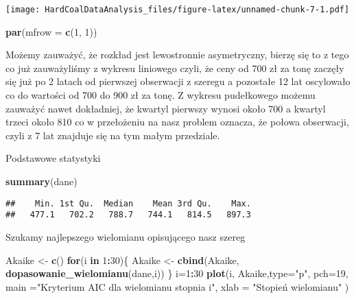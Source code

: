 \documentclass[
]{article}
\newenvironment{Shaded}{\begin{snugshade}}{\end{snugshade}}
\newcommand{\AttributeTok}[1]{\textcolor[rgb]{0.13,0.29,0.53}{#1}}
\newcommand{\ControlFlowTok}[1]{\textcolor[rgb]{0.13,0.29,0.53}{\textbf{#1}}}
\newcommand{\DecValTok}[1]{\textcolor[rgb]{0.00,0.00,0.81}{#1}}
\newcommand{\FunctionTok}[1]{\textcolor[rgb]{0.13,0.29,0.53}{\textbf{#1}}}
\newcommand{\NormalTok}[1]{#1}
\newcommand{\OtherTok}[1]{\textcolor[rgb]{0.56,0.35,0.01}{#1}}
\newcommand{\SpecialCharTok}[1]{\textcolor[rgb]{0.81,0.36,0.00}{\textbf{#1}}}
\newcommand{\StringTok}[1]{\textcolor[rgb]{0.31,0.60,0.02}{#1}}
\begin{document}
\texttt{[image: HardCoalDataAnalysis\_files/figure-latex/unnamed-chunk-7-1.pdf]}

\begin{Shaded}
\begin{Highlighting}[]
\FunctionTok{par}\NormalTok{(}\AttributeTok{mfrow =} \FunctionTok{c}\NormalTok{(}\DecValTok{1}\NormalTok{, }\DecValTok{1}\NormalTok{))  }
\end{Highlighting}
\end{Shaded}

Możemy zauważyć, że rozkład jest lewostronnie asymetryczny, bierzę się
to z tego co już zauważyliśmy z wykresu liniowego czyli, że ceny od 700
zł za tonę zaczęły się już po 2 latach od pierwszej obserwacji z szeregu
a pozostałe 12 lat oscylowało co do wartości od 700 do 900 zł za tonę. Z
wykresu pudełkowego możemu zauważyć nawet dokładniej, że kwartyl
pierwszy wynosi około 700 a kwartyl trzeci około 810 co w przełożeniu na
nasz problem oznacza, że połowa obserwacji, czyli z 7 lat znajduje się
na tym małym przedziale.

Podstawowe statystyki

\begin{Shaded}
\begin{Highlighting}[]
\FunctionTok{summary}\NormalTok{(dane)}
\end{Highlighting}
\end{Shaded}

\begin{verbatim}
##    Min. 1st Qu.  Median    Mean 3rd Qu.    Max. 
##   477.1   702.2   788.7   744.1   814.5   897.3
\end{verbatim}

Szukamy najlepszego wielomianu opisującego nasz szereg

\begin{Shaded}
\begin{Highlighting}[]
\NormalTok{Akaike }\OtherTok{\textless{}{-}} \FunctionTok{c}\NormalTok{()}
\ControlFlowTok{for}\NormalTok{(i }\ControlFlowTok{in} \DecValTok{1}\SpecialCharTok{:}\DecValTok{30}\NormalTok{)\{}
\NormalTok{  Akaike }\OtherTok{\textless{}{-}} \FunctionTok{cbind}\NormalTok{(Akaike, }\FunctionTok{dopasowanie\_wielomianu}\NormalTok{(dane,i))}
\NormalTok{\}}
\NormalTok{i}\OtherTok{=}\DecValTok{1}\SpecialCharTok{:}\DecValTok{30}
\FunctionTok{plot}\NormalTok{(i, Akaike,}\AttributeTok{type=}\StringTok{"p"}\NormalTok{, }\AttributeTok{pch=}\DecValTok{19}\NormalTok{, }\AttributeTok{main =}\StringTok{"Kryterium AIC dla wielomianu stopnia i"}\NormalTok{, }\AttributeTok{xlab =} \StringTok{"Stopień wielomianu"}\NormalTok{ )}
\end{Highlighting}
\end{Shaded}
\end{document}
